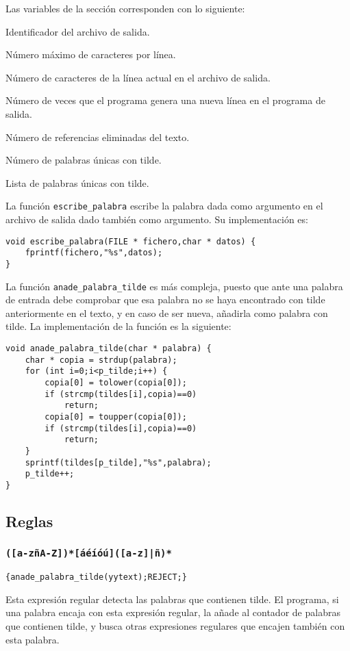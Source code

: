 \documentclass[12pt,titlepage,a4paper]{article}
\theoremstyle{definicion}
\theoremstyle{lema}
\theoremstyle{teorema}
\theoremstyle{corolario}
\theoremstyle{ejemplo}
\theoremstyle{nota}
\begin{document}
Las variables de la sección corresponden con lo siguiente:
\begin{description}[align=right,labelwidth=4em,noitemsep]
\item [\texttt{salida}] Identificador del archivo de salida.
\item [\texttt{MAX\_CHAR}] Número máximo de caracteres por línea.
\item [\texttt{num\_char}] Número de caracteres de la línea actual en el
archivo de salida.
\item [\texttt{lin\_cor}] Número de veces que el programa genera una nueva
línea en el programa de salida.
\item [\texttt{ref\_elim}] Número de referencias eliminadas del texto.
\item [\texttt{p\_tilde}] Número de palabras únicas con tilde.
\item [\texttt{tildes}] Lista de palabras únicas con tilde.
\end{description}
La función \texttt{escribe\_palabra} escribe la palabra dada como argumento
en el archivo de salida dado también como argumento. Su implementación es:
\begin{lstlisting}
void escribe_palabra(FILE * fichero,char * datos) {
    fprintf(fichero,"%s",datos);
}
\end{lstlisting}
La función \texttt{anade\_palabra\_tilde} es más compleja, puesto que ante
una palabra de entrada debe comprobar que esa palabra no se haya encontrado
con tilde anteriormente en el texto, y en caso de ser nueva, añadirla como
palabra con tilde. La implementación de la función es la siguiente:
\begin{lstlisting}
void anade_palabra_tilde(char * palabra) {
    char * copia = strdup(palabra);
    for (int i=0;i<p_tilde;i++) {
        copia[0] = tolower(copia[0]);
        if (strcmp(tildes[i],copia)==0)
            return;
        copia[0] = toupper(copia[0]);
        if (strcmp(tildes[i],copia)==0)
            return;
    }
    sprintf(tildes[p_tilde],"%s",palabra);
    p_tilde++;
}
\end{lstlisting}

\subsection{Reglas}
\smallskip
\subsubsection*{\texttt{([a-zñA-Z])*[áéíóú]([a-z]|ñ)*}}
\begin{lstlisting}
{anade_palabra_tilde(yytext);REJECT;}
\end{lstlisting}
Esta expresión regular detecta las palabras que contienen tilde. El programa,
si una palabra encaja con esta expresión regular, la añade al contador de
palabras que contienen tilde, y busca otras expresiones regulares que encajen
también con esta palabra.
\end{document}
